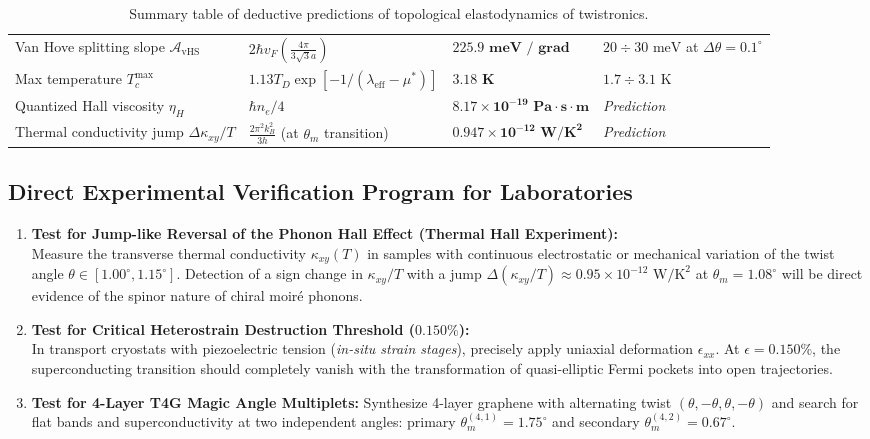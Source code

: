 \documentclass[12pt,a4paper]{article}
\begin{document}
\begin{table}[H]
\begin{tabularx}{\textwidth}{p{3.4cm} p{5.2cm} p{3.8cm} >{\raggedleft\arraybackslash}X}
Van Hove splitting slope $\mathcal{A}_{\text{vHS}}$ & $2\hbar v_F (\frac{4\pi}{3\sqrt{3}a})$ & $\mathbf{225.9\text{ meV / grad}}$ & $20 \div 30\text{ meV}$ at $\Delta\theta=0.1^\circ$ \\
Max temperature $T_c^{\text{max}}$ & $1.13 T_D \exp[-1/(\lambda_{\text{eff}}-\mu^*)]$ & $\mathbf{3.18\text{ K}}$ & $1.7 \div 3.1\text{ K}$ \\
Quantized Hall viscosity $\eta_H$ & $\hbar n_e / 4$ & $\mathbf{8.17 \times 10^{-19}\text{ Pa}\cdot\text{s}\cdot\text{m}}$ & \textit{Prediction} \\
Thermal conductivity jump $\Delta\kappa_{xy}/T$ & $\frac{2\pi^2 k_B^2}{3 h}$ (at $\theta_m$ transition) & $\mathbf{0.947 \times 10^{-12}\text{ W/K}^2}$ & \textit{Prediction} \\
\bottomrule
\end{tabularx}
\caption{Summary table of deductive predictions of topological elastodynamics of twistronics.}
\label{tab:twistronics_summary_corrected}
\end{table}

\subsection{Direct Experimental Verification Program for Laboratories}
												
\begin{enumerate}
\item \textbf{Test for Jump-like Reversal of the Phonon Hall Effect (Thermal Hall Experiment):}\\
Measure the transverse thermal conductivity $\kappa_{xy}(T)$ in samples with continuous electrostatic or mechanical variation of the twist angle $\theta \in [1.00^\circ, 1.15^\circ]$. Detection of a sign change in $\kappa_{xy}/T$ with a jump $\Delta(\kappa_{xy}/T) \approx 0.95 \times 10^{-12}\text{ W/K}^2$ at $\theta_m = 1.08^\circ$ will be direct evidence of the spinor nature of chiral moiré phonons.

\item \textbf{Test for Critical Heterostrain Destruction Threshold ($0.150\%$):}\\
In transport cryostats with piezoelectric tension (\textit{in-situ strain stages}), precisely apply uniaxial deformation $\epsilon_{xx}$. At $\epsilon = 0.150\%$, the superconducting transition should completely vanish with the transformation of quasi-elliptic Fermi pockets into open trajectories.
													
\item \textbf{Test for 4-Layer T4G Magic Angle Multiplets:}
Synthesize 4-layer graphene with alternating twist $(\theta, -\theta, \theta, -\theta)$ and search for flat bands and superconductivity at two independent angles: primary $\theta_m^{(4,1)} = 1.75^\circ$ and secondary $\theta_m^{(4,2)} = 0.67^\circ$.
\end{enumerate}
												
\end{document}
